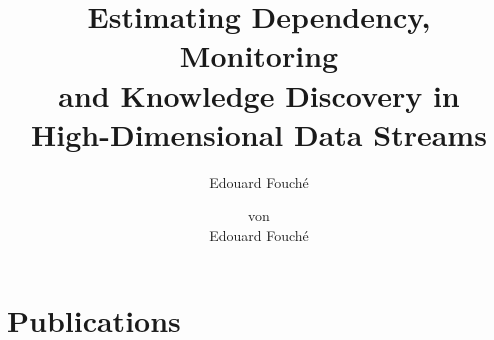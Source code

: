 \documentclass[smalldiss]{sdqdiss-a4}
\title{\LARGE Estimating Dependency, Monitoring \\ and Knowledge Discovery in \\ High-Dimensional Data Streams}
\author{Edouard Fouché}
\subtitle{
	\vskip2em
	zur Erlangung des akademischen Grades eines\\[1em]
	{\Large Doktors der Ingenieurwissenschaften /}\\
	{\Large Doktors der Naturwissenschaften}\\[1em]
	{\normalsize der Fakult{\"a}t f{\"u}r Informatik}\\
	{\normalsize des Karlsruher Instituts f{\"u}r Technologie (KIT)}\\[1em]
	{\normalsize\textbf{vorgelegte}}\\[.5em]
	{\Large\textbf{Dissertation}}
}
\author{\normalsize{von}\\[.5em]
	{\LARGE Edouard Fouché}\\
}
\date{}
\begin{document}
\chapter*{Publications}

	

\end{document}
